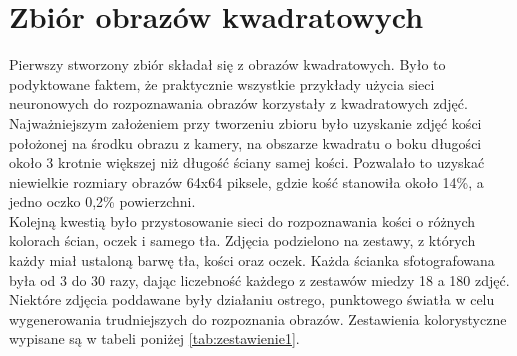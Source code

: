 \section{Zbiór obrazów kwadratowych}
Pierwszy stworzony zbiór składał się z obrazów kwadratowych. Było to podyktowane
faktem, że praktycznie wszystkie przykłady użycia sieci neuronowych do rozpoznawania
obrazów korzystały z kwadratowych zdjęć.\\
Najważniejszym założeniem przy tworzeniu zbioru było uzyskanie zdjęć kości położonej
na środku obrazu z kamery, na obszarze kwadratu o boku długości około 3 krotnie większej
niż długość ściany samej kości. Pozwalało to uzyskać niewielkie rozmiary obrazów 64x64 piksele,
gdzie kość stanowiła około 14\%, a jedno oczko 0,2\% powierzchni.\\
Kolejną kwestią było przystosowanie sieci do rozpoznawania kości o różnych kolorach ścian,
oczek i samego tła. Zdjęcia podzielono na zestawy, z których każdy miał ustaloną
barwę tła, kości oraz oczek. Każda ścianka sfotografowana była od 3 do 30 razy, dając
liczebność każdego z zestawów miedzy 18 a 180 zdjęć. Niektóre zdjęcia poddawane były
działaniu ostrego, punktowego światła w celu wygenerowania trudniejszych do rozpoznania obrazów.
Zestawienia kolorystyczne wypisane są w tabeli poniżej \ref{tab:zestawienie1}.

